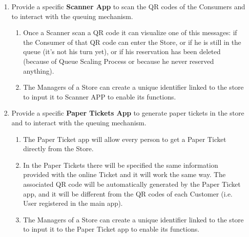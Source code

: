 \documentclass[a4paper, 10pt, oneside]{article}
\begin{document}
\begin{enumerate}[align=left, label={R.\arabic{*}}]
    \item \label{req:scannerApp}Provide a specific \textbf{Scanner App} to scan the QR codes of the Consumers and to interact with the queuing mechanism.
    \begin{enumerate}[label={-}]
        \item \label{req:scannerApp:response} Once a Scanner scan a QR code it can visualize one of this messages: if the Consumer of that QR code can enter the Store, or if he is still in the queue (it's not his turn yet), or if his reservation has been deleted (because of Queue Scaling Process or because he never reserved anything).
        \item \label{req:scannerApp:createCode} The Managers of a Store can create a unique identifier linked to the store to input it to Scanner APP to enable its functions.
    \end{enumerate}
    
    \item \label{req:paperTicketApp}Provide a specific \textbf{Paper Tickets App} to generate paper tickets in the store and to interact with the queuing mechanism.
    \begin{enumerate}[label={-}]
        \item \label{req:paperTicketApp:func}The Paper Ticket app will allow every person to get a Paper Ticket directly from the Store.
        \item \label{req:paperTicketApp:funcPaperTick}In the Paper Tickets there will be specified the same information provided with the online Ticket and it will work the same way. The associated QR code will be automatically generated by the Paper Ticket app, and it will be different from the QR codes of each Customer (i.e. User registered in the main app).
        \item \label{req:paperTicketApp:createCode}The Managers of a Store can create a unique identifier linked to the store to input it to the Paper Ticket app to enable its functions.
    \end{enumerate}
    

\end{enumerate}
\end{document}
